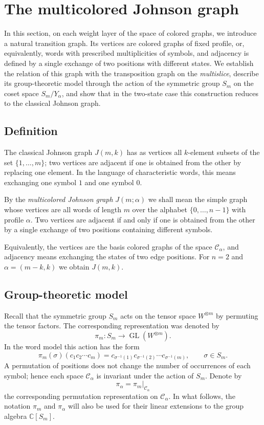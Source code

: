 \documentclass[12pt,reqno]{amsart}
\begin{document}
\section{The multicolored Johnson graph}
\label{multislice_graph}

In this section, on each weight layer of the space of colored graphs, we
introduce a natural transition graph. Its vertices are colored graphs of
fixed profile, or, equivalently, words with prescribed multiplicities of
symbols, and adjacency is defined by a single exchange of two positions
with different states. We establish the relation of this graph with the
transposition graph on the \emph{multislice}, describe its group-theoretic
model through the action of the symmetric group $S_m$ on the coset space
$S_m/Y_\alpha$, and show that in the two-state case this construction
reduces to the classical Johnson graph.


\subsection{Definition}

The classical Johnson graph $J(m,k)$ has as vertices all $k$-element
subsets of the set $\{1,\dots,m\}$; two vertices are adjacent if one is
obtained from the other by replacing one element. In the language of
characteristic words, this means exchanging one symbol $1$ and one symbol
$0$.


By the \textit{multicolored Johnson graph} $J(m;\alpha)$ we shall mean
the simple graph whose vertices are all words of length $m$ over the
alphabet $\{0,\dots,n-1\}$ with profile $\alpha$. Two vertices are
adjacent if and only if one is obtained from the other by a single
exchange of two positions containing different symbols.


Equivalently, the vertices are the basis colored graphs of the space
$\mathcal C_\alpha$, and adjacency means exchanging the states of two
edge positions. For $n=2$ and $\alpha=(m-k,k)$ we obtain $J(m,k)$.



\subsection{Group-theoretic model}

Recall that the symmetric group $S_m$ acts on the tensor space
$W^{\otimes m}$ by permuting the tensor factors. The corresponding
representation was denoted by
$$
\pi_m:S_m\longrightarrow\operatorname{GL}(W^{\otimes m}).
$$
In the word model this action has the form
$$
\pi_m(\sigma)(c_1c_2\cdots c_m)
=
c_{\sigma^{-1}(1)}
c_{\sigma^{-1}(2)}
\cdots
c_{\sigma^{-1}(m)},
\qquad
\sigma\in S_m.
$$
A permutation of positions does not change the number of occurrences of
each symbol; hence each space $\mathcal C_\alpha$ is invariant under the
action of $S_m$. Denote by
$$
\pi_\alpha
=
\pi_m\big|_{\mathcal C_\alpha}
$$
the corresponding permutation representation on $\mathcal C_\alpha$. In
what follows, the notation $\pi_m$ and $\pi_\alpha$ will also be used for
their linear extensions to the group algebra $\mathbb C[S_m]$.
\end{document}
